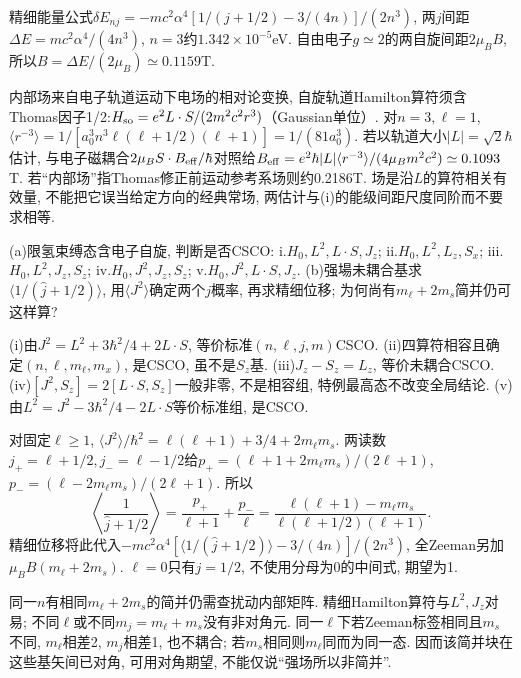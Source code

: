 \begin{solution}
精细能量公式$\delta E_{nj}=-mc^2\alpha^4[1/(j+1/2)-3/(4n)]/(2n^3)$, 两$j$间距$\Delta E=mc^2\alpha^4/(4n^3)$, $n=3$约$1.342\times10^{-5}$eV. 自由电子$g\simeq2$的两自旋间距$2\mu_BB$, 所以$B=\Delta E/(2\mu_B)\simeq0.1159$T.

内部场来自电子轨道运动下电场的相对论变换, 自旋轨道Hamilton算符须含Thomas因子1/2:$H_{\rm so}=e^2L\cdot S/(2m^2c^2r^3)$（Gaussian单位）. 对$n=3,\ell=1$, $\langle r^{-3}\rangle=1/[a_0^3n^3\ell(\ell+1/2)(\ell+1)]=1/(81a_0^3)$. 若以轨道大小$|L|=\sqrt2\hbar$估计, 与电子磁耦合$2\mu_BS\cdot B_{\rm eff}/\hbar$对照给$B_{\rm eff}=e^2\hbar|L|\langle r^{-3}\rangle/(4\mu_Bm^2c^2)\simeq0.1093$T. 若“内部场”指Thomas修正前运动参考系场则约0.2186T. 场是沿$L$的算符相关有效量, 不能把它误当给定方向的经典常场, 两估计与(i)的能级间距尺度同阶而不要求相等.
\end{solution}
\begin{exercise}
(a)限氢束缚态含电子自旋, 判断是否CSCO: i.$H_0,L^2,L\cdot S,J_z$; ii.$H_0,L^2,L_z,S_x$; iii.$H_0,L^2,J_z,S_z$; iv.$H_0,J^2,J_z,S_z$; v.$H_0,J^2,L\cdot S,J_z$. (b)强場未耦合基求$\langle1/(\hat j+1/2)\rangle$, 用$\langle J^2\rangle$确定两个$j$概率, 再求精细位移; 为何尚有$m_\ell+2m_s$简并仍可这样算?
\end{exercise}
\begin{solution}
(i)由$J^2=L^2+3\hbar^2/4+2L\cdot S$, 等价标准$(n,\ell,j,m)$CSCO. (ii)四算符相容且确定$(n,\ell,m_\ell,m_x)$, 是CSCO, 虽不是$S_z$基. (iii)$J_z-S_z=L_z$, 等价未耦合CSCO. (iv)$[J^2,S_z]=2[L\cdot S,S_z]$一般非零, 不是相容组, 特例最高态不改变全局结论. (v)由$L^2=J^2-3\hbar^2/4-2L\cdot S$等价标准组, 是CSCO.

对固定$\ell\ge1$, $\langle J^2\rangle/\hbar^2=\ell(\ell+1)+3/4+2m_\ell m_s$. 两读数$j_+=\ell+1/2,j_-=\ell-1/2$给$p_+=(\ell+1+2m_\ell m_s)/(2\ell+1)$,$p_-=(\ell-2m_\ell m_s)/(2\ell+1)$. 所以
\[
\left\langle\frac1{\hat j+1/2}\right\rangle
=\frac{p_+}{\ell+1}+\frac{p_-}{\ell}
=\frac{\ell(\ell+1)-m_\ell m_s}{\ell(\ell+1/2)(\ell+1)}.
\]
精细位移将此代入$-mc^2\alpha^4[\langle1/(\hat j+1/2)\rangle-3/(4n)]/(2n^3)$, 全Zeeman另加$\mu_BB(m_\ell+2m_s)$. $\ell=0$只有$j=1/2$, 不使用分母为0的中间式, 期望为1.

同一$n$有相同$m_\ell+2m_s$的简并仍需查扰动内部矩阵. 精细Hamilton算符与$L^2,J_z$对易; 不同$\ell$或不同$m_j=m_\ell+m_s$没有非对角元. 同一$\ell$下若Zeeman标签相同且$m_s$不同, $m_\ell$相差2, $m_j$相差1, 也不耦合; 若$m_s$相同则$m_\ell$同而为同一态. 因而该简并块在这些基矢间已对角, 可用对角期望, 不能仅说“强场所以非简并”.
\end{solution}
